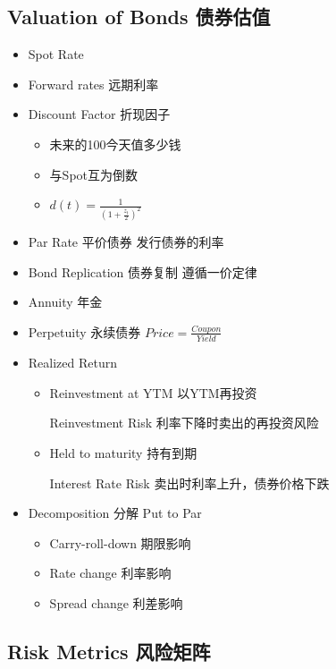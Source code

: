 \documentclass[a4paper,6pt,twoside,openany]{article}
\begin{document}
\subsection{Valuation of Bonds 债券估值}
\begin{itemize}
\item Spot Rate
\item Forward rates 远期利率
\item Discount Factor 折现因子
  \begin{itemize}
  \item 未来的100今天值多少钱
  \item 与Spot互为倒数
  \item $d(t) =\frac{1}{(1 + \frac{z_t}{2})^2}$
  \end{itemize}
\item Par Rate 平价债券 发行债券的利率
\item Bond Replication 债券复制 遵循一价定律
\item Annuity 年金
\item Perpetuity 永续债券  $Price = \frac{Coupon}{Yield}$
\item Realized Return
  \begin{itemize}
  \item Reinvestment at YTM 以YTM再投资
    \par Reinvestment Risk 利率下降时卖出的再投资风险
  \item Held to maturity 持有到期
    \par Interest Rate Risk 卖出时利率上升，债券价格下跌
  \end{itemize}
\item Decomposition 分解 Put to Par
  \begin{itemize}
  \item Carry-roll-down 期限影响
  \item Rate change 利率影响
  \item Spread change 利差影响
  \end{itemize}
\end{itemize}

\subsection{Risk Metrics 风险矩阵}
\end{document}
